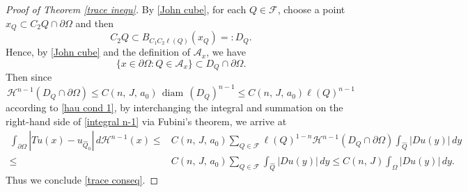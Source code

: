 \documentclass[reqno,11pt]{amsart}
\def\bint{{\ifinner\rlap{\bf\kern.35em--}
\int\else\rlap{\bf\kern.45em--}\int\fi}\ignorespaces}
\def\diam{{\mathop\mathrm{\,diam\,}}}
\numberwithin{equation}{section}
\theoremstyle{remark}
\def\bint{{\ifinner\rlap{\bf\kern.35em--}
\int\else\rlap{\bf\kern.45em--}\int\fi}\ignorespaces}
\begin{document}
\begin{proof}[Proof of Theorem \ref{trace inequ}]
By \eqref{John cube}, for each $Q\in\mathscr{F}$, choose a point $x_Q\subset C_2 Q\cap \partial  \Omega$ and then 
$$
    C_2Q \subset B_{C_1C_2\ell(Q)}(x_Q)=:D_Q.
$$
Hence, by \eqref{John cube} and the definition of $\mathscr{A}_x$, we have
$$\{x\in \partial \Omega\colon Q\in \mathscr A_x\}\subset D_Q\cap \partial \Omega.$$
Then since
$$\mathcal H^{n-1}(D_Q\cap  \partial \Omega)\le C(n,\,J,\,a_0) \diam(D_Q)^{n-1} \le C(n,\,J,\,a_0) \ell(Q)^{n-1}$$
according to \eqref{hau cond 1}, by interchanging the integral and summation on the right-hand side of \eqref{integral n-1} via Fubini's theorem, we arrive at
\begin{align*}\int_{\partial \Omega} |Tu(x)-u_{\hat{Q}_0}|\, d\mathcal H^{n-1}(x)\le & C(n,\,J,\,a_0)   \sum_{Q\in\mathscr F} \ell(Q)^{1-n}\mathcal H^{n-1}(D_Q\cap  \partial \Omega) \int_{\hat{Q}}|Du(y)|\,dy \\
\le & C(n,\,J,\,a_0) \sum_{Q\in\mathscr F}   \int_{\hat{Q}}|Du(y)|\,dy \le  C(n,\,J) \int_{\Omega} |Du(y)|\, dy.
\end{align*}
Thus we conclude \eqref{trace conseq}.


\end{proof}
\end{document}
